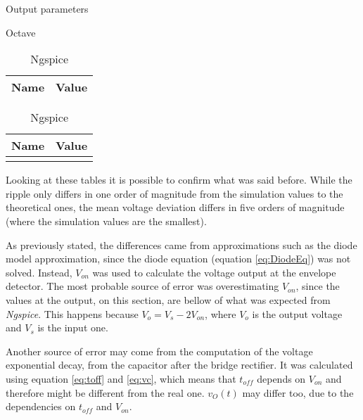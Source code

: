 \begin{table}[H]
    \caption{Output parameters}
    \begin{subtable}{.5\linewidth}
      \centering
        \caption{Octave}
        \begin{tabular}{ll}
        \hline    
        {\bf Name} & {\bf Value} \\ \hline
        
        \end{tabular}
        \label{tab:OutParamOc}
    \end{subtable}%
    \begin{subtable}{.5\linewidth}
      \centering
        \caption{Ngspice}
        \begin{tabular}{ll}
        \hline    
        {\bf Name} & {\bf Value} \\ \hline
        }
        \end{tabular}
        \label{tab:OutParamNG}
    \end{subtable} 
    \label{tab:OutParam}
\end{table}






\indent

Looking at these tables it is possible to confirm what was said before. While the ripple only differs in one order of magnitude from the simulation values to the theoretical ones, the mean voltage deviation differs in five orders of magnitude (where the simulation values are the smallest).

As previously stated, the differences came from approximations such as the diode model approximation, since the diode equation (equation \ref{eq:DiodeEq}) was not solved. Instead, $V_{on}$ was used to calculate the voltage output at the envelope detector. The most probable source of error was overestimating $V_{on}$, since the values at the output, on this section, are bellow of what was expected from \textit{Ngspice}. This happens because $V_o= V_s-2V_{on}$, where $V_o$ is the output voltage and $V_s$ is the input one. 

Another source of error may come from the computation of the voltage exponential decay, from the capacitor after the bridge rectifier. It was calculated using equation \ref{eq:toff} and \ref{eq:vc}, which means that $t_{off}$ depends on $V_{on}$ and therefore might be different from the real one. $v_O(t)$ may differ too, due to the dependencies on $t_{off}$ and $V_{on}$.

